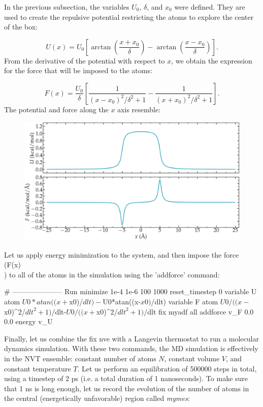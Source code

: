 In the previous subsection, the variables $U_0$, $\delta$, and
$x_0$ were defined. They are used to create the repulsive potential
restricting the atoms to explore the center of the box: 

$$U(x) = U_0 \left[ \arctan \left( \dfrac{x+x_0}{\delta} \right) - \arctan \left(\dfrac{x-x_0}{\delta} \right) \right]. $$
From the derivative of the
potential with respect to $x$, we obtain the expression
for the force that will be imposed to the atoms:

$$F(x)= \dfrac{U_0}{\delta} \left[ \dfrac{1}{(x-x_0)^2/\delta^2+1} - \dfrac{1}{(x+x_0)^2/\delta^2+1} \right].$$
The potential and force along the $x$
axis resemble:

\begin{figure}
\includegraphics[width=\linewidth]{tutorials/level3/free-energy-calculation/potential-light.png}
\end{figure}

Let us apply energy minimization to the system, and then impose
the force \\(F(x)\\) to all of the atoms in the simulation using the 'addforce' command:

\begin{lcverbatim}
# --------------------- Run
minimize 1e-4 1e-6 100 1000
reset_timestep 0
variable U atom ${U0}*atan((x+${x0})/${dlt})-${U0}*atan((x-${x0})/${dlt})
variable F atom ${U0}/((x-${x0})^2/${dlt}^2+1)/${dlt}-${U0}/((x+${x0})^2/${dlt}^2+1)/${dlt}
fix myadf all addforce v_F 0.0 0.0 energy v_U
\end{lcverbatim}

\noindent Finally, let us combine the fix nve with a Langevin
thermostat to run a molecular dynamics simulation. With
these two commands, the MD simulation is effectively in the
NVT ensemble: constant number of atoms $N$, constant
volume $V$, and constant temperature $T$. Let us
perform an equilibration of 500000 steps in total,
using a timestep of 2 ps (i.e. a total duration of 1
nanoseconds). To make sure that 1 ns is long enough, let us
record the evolution of the number of atoms in the central
(energetically unfavorable) region called \textit{mymes}:

